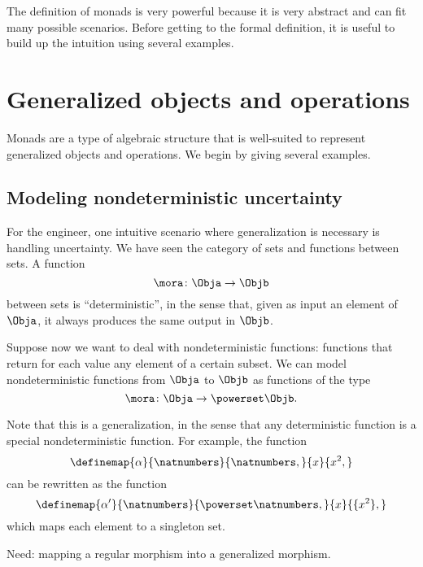 

The definition of monads is very powerful because it is very abstract and can fit many possible scenarios. Before getting to the formal definition, it is useful to build up the intuition using several examples. 

\section{Generalized objects and operations}


Monads are a type of algebraic structure that is well-suited to represent generalized objects and operations. We begin by giving several examples. 


\subsection{Modeling nondeterministic uncertainty}

For the engineer, one intuitive scenario where generalization is necessary is handling uncertainty. 
We have seen the category  \Set of sets and functions between sets. A function 
\begin{equation}
    \mora\colon\Obja\to\Objb
\end{equation}
between sets is ``deterministic'', in the sense that, given as input an element of $\Obja$, it always produces the same output in $\Objb$. 

Suppose now we want to deal with nondeterministic functions: functions that return for each value any element of a certain subset.  We can model nondeterministic functions from $\Obja$ to $\Objb$ as functions of the type 
\begin{equation}
    \mora\colon\Obja\to\powerset\Objb.
\end{equation}

Note that this is a generalization, in the sense that any deterministic function is a special nondeterministic function. 
For example, the function
% 
\begin{equation}
    \definemap{\alpha}{\natnumbers}{\natnumbers,}%
    {x}{x^2,}
\end{equation}
% 
can be rewritten as the function
% 
\begin{equation}
    \definemap{\alpha'}{\natnumbers}{\powerset\natnumbers,}%
    {x}{\{x^2\},}
\end{equation}
% 
which maps each element to a singleton set.

Need: mapping a regular morphism into a generalized morphism.

